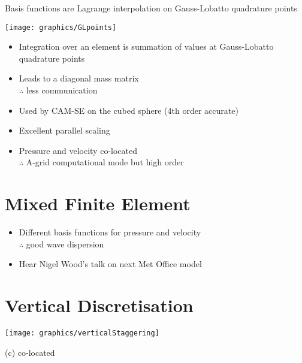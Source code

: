 \begin{minipage}[t]{0.48\columnwidth}%
Basis functions are Lagrange interpolation on Gauss-Lobatto quadrature
points

\texttt{[image: graphics/GLpoints]}%
\end{minipage}\hfill{}%
\begin{minipage}[t]{0.48\columnwidth}%
\begin{itemize}
\item Integration over an element is summation of values at Gauss-Lobatto
quadrature points
\item Leads to a diagonal mass matrix\\
$\therefore$ less communication 
\item Used by CAM-SE on the cubed sphere (4th order accurate)
\item Excellent parallel scaling
\item Pressure and velocity co-located\\
$\therefore$ A-grid computational mode but high order
\end{itemize}
%
\end{minipage}

\clearpage{}

\section*{Mixed Finite Element}
\begin{itemize}
\item Different basis functions for pressure and velocity\\
$\therefore$ good wave dispersion
\item Hear Nigel Wood's talk on next Met Office model
\end{itemize}
\clearpage{}

\section*{Vertical Discretisation}

\vspace{-1cm}
\begin{minipage}[t]{0.66\columnwidth}%
\phantom{}\texttt{[image: graphics/verticalStaggering]}%
\end{minipage} %
\begin{minipage}[t]{0.25\columnwidth}%
\begin{center}
\phantom{}\vspace{-0.3cm}
(c) co-located
\par\end{center}
\resizebox{1\textwidth}{!}{}%
\end{minipage}

